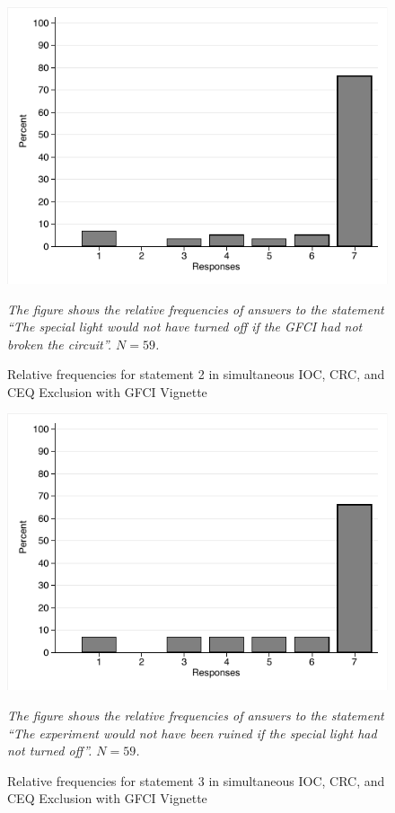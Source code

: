 \documentclass[egregdoesnotlikesansseriftitles,12pt]{scrartcl}
\begin{document}
\begin{figure}[H]
   \centering
   \includegraphics[scale=0.8]{figures/cir_com_hist_2.pdf}
   \begin{minipage}{0.9\linewidth}
   \footnotesize
   \emph{The figure shows the relative frequencies of answers to the statement ``The special light would not have turned off if the GFCI had not broken the circuit''. $N=59$.}
   \end{minipage}
   \caption{Relative frequencies for statement 2 in simultaneous IOC, CRC, and CEQ Exclusion with GFCI Vignette}
   \label{fig:cir_com_hist_2}
\end{figure}

\begin{figure}[H]
   \centering
   \includegraphics[scale=0.8]{figures/cir_com_hist_3.pdf}
   \begin{minipage}{0.9\linewidth}
   \footnotesize
   \emph{The figure shows the relative frequencies of answers to the statement ``The experiment would not have been ruined if the special light had not turned off''. $N=59$.}
   \end{minipage}
   \caption{Relative frequencies for statement 3 in simultaneous IOC, CRC, and CEQ Exclusion with GFCI Vignette}
   \label{fig:cir_com_hist_3}
\end{figure}
\end{document}
